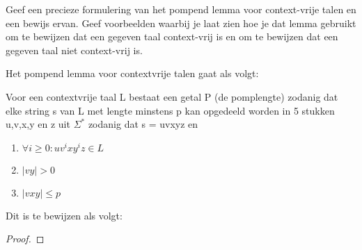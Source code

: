 \begin{question}
Geef een precieze formulering van het pompend lemma voor context-vrije talen en een bewijs ervan. Geef voorbeelden waarbij je laat zien hoe je dat lemma gebruikt om te bewijzen dat een gegeven taal context-vrij is en om te bewijzen dat een gegeven taal niet context-vrij is.
\end{question}

Het pompend lemma voor contextvrije talen gaat als volgt:
\begin{theorem}
Voor een contextvrije taal L bestaat een getal P (de pomplengte) zodanig dat elke string s van L met lengte minstens p kan opgedeeld worden in 5 stukken u,v,x,y en z uit $\Sigma^*$ zodanig dat s = uvxyz en 
\begin{enumerate}
\item $\forall i \geq 0 : uv^ixy^iz \in L$
\item $|vy| > 0$
\item $|vxy| \leq p$
\end{enumerate}
\end{theorem}

Dit is te bewijzen als volgt:
\begin{proof}

\end{proof}

